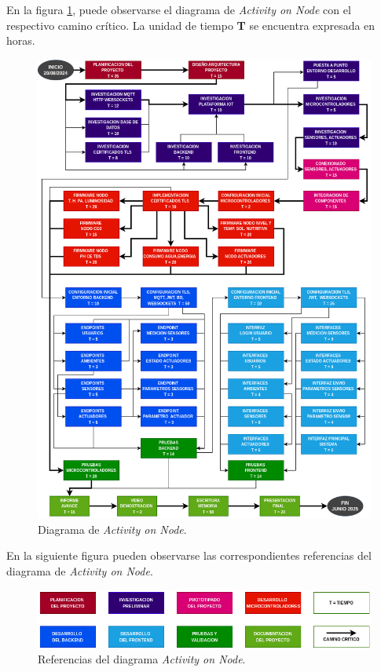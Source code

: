 En la figura \ref{fig:AoN}, puede observarse el diagrama de \textit{Activity on Node} con el respectivo camino crítico. 
La unidad de tiempo \textbf{T}  se encuentra expresada en horas.

\vspace{5mm} %

\begin{figure}[htpb]
	\centering
	\includegraphics[width=.84\linewidth]{./Figuras/AoN.png}
	\caption{Diagrama de \textit{Activity on Node}.}
	\label{fig:AoN}
\end{figure}

\pagebreak
En la siguiente figura pueden observarse las correspondientes referencias del diagrama de \textit{Activity on Node}.

\begin{figure}[htpb]
	\begin{flushleft}
	\end{flushleft}
	\centering
	\includegraphics[width=.99\textwidth]{./Figuras/AoN_Detalle.png}
	\caption{Referencias del diagrama \textit{Activity on Node}.}
	\label{fig:AoN_Detail}
\end{figure}
